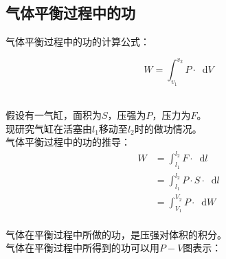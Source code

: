 \documentclass[UTF8]{ctexart}
\newcommand*{\dif}{\mathop{}\!\mathrm{d}}
\begin{document}
\newpage

\subsection{气体平衡过程中的功}
    \setcounter{equation}{0}
    气体平衡过程中的功的计算公式：
    \begin{large}
        \begin{equation*}
            W=\int_{v_1}^{v_2}P\cdot\dif V
        \end{equation*}
    \end{large}\\
    假设有一气缸，面积为$S$，压强为$P$，压力为$F$。\\[3mm]
    现研究气缸在活塞由$l_1$移动至$l_2$时的做功情况。\\[3mm]
    气体平衡过程中的功的推导：
    \begin{align}
        W
        &=\int_{l_1}^{l_2}F\cdot\dif l\\[3mm]
        &=\int_{l_1}^{l_2}P\cdot S\cdot\dif l\\[3mm]
        &=\int_{V_1}^{V_2}P\cdot\dif W
    \end{align}\\
    气体在平衡过程中所做的功，是压强对体积的积分。\\[3mm]
    气体在平衡过程中所得到的功可以用$P-V$图表示：\vspace{5pt}
\end{document}
